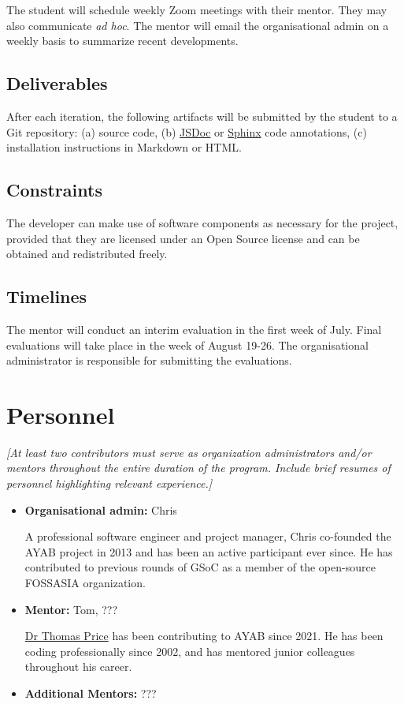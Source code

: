 \documentclass{article}
\begin{document}
The student will schedule weekly Zoom meetings with their mentor. They may also communicate \textit{ad hoc}. The mentor will email the organisational admin on a weekly basis to summarize recent developments.

\subsection{Deliverables}
After each iteration, the following artifacts will be submitted by the student to a Git repository: (a) source code, (b) \href{https://jsdoc.app/}{JSDoc} or \href{https://www.sphinx-doc.org/en/master/}{Sphinx} code annotations, (c) installation instructions in Markdown or HTML.

\subsection{Constraints}
The developer can make use of software components as necessary for the project, provided that they are licensed under an Open Source license and can be obtained and redistributed freely.

\subsection{Timelines}
The mentor will conduct an interim evaluation in the first week of July. Final evaluations will take place in the week of August 19-26. The organisational administrator is responsible for submitting the evaluations.


\section{Personnel}

{\itshape 
[At least two contributors must serve as organization administrators and/or mentors throughout the entire duration of the program. Include brief resumes of personnel highlighting relevant experience.]
}

\begin{itemize}
\item \textbf{Organisational admin:} Chris

A professional software engineer and project manager, Chris co-founded the AYAB project in 2013 and has been an active participant ever since. He has contributed to previous rounds of GSoC as a member of the open-source FOSSASIA organization.

\item \textbf{Mentor:} Tom, ???

\href{https://t0mpr1c3.github.io/}{Dr Thomas Price} has been contributing to AYAB since 2021. He has been coding professionally since 2002, and has mentored junior colleagues throughout his career.

\item \textbf{Additional Mentors:} ???
\end{itemize}
\end{document}
